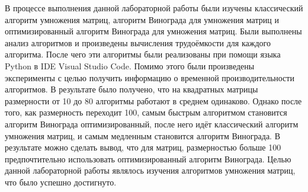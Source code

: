 \Conclusion
В процессе выполнения данной лабораторной работы были изучены классический алгоритм умножения матриц, алгоритм Винограда для умножения матриц и оптимизированный алгоритм Винограда для умножения матриц. Были выполнены анализ алгоритмов и произведены вычисления трудоёмкости для каждого алгоритма. После чего эти алгоритмы были реализованы при помощи языка Python в IDE Visual Studio Code. Помимо этого были произведены эксперименты с целью получить информацию о временной производительности алгоритмов. В результате было получено, что на квадратных матрицы размерности от 10 до 80 алгоритмы работают в среднем одинаково. Однако после того, как размерность переходит 100, самым быстрым алгоритмом становится алгоритм Винограда оптимизированный, после него идёт классический алгоритм умножения матриц, и самым медленным становится алгоритм Винограда. В результате можно сделать вывод, что для матриц, размерностью больше 100 предпочтительно использовать оптимизированный алгоритм Винограда. Целью данной лабораторной работы являлось изучения алгоритмов умножения матриц, что было успешно достигнуто.